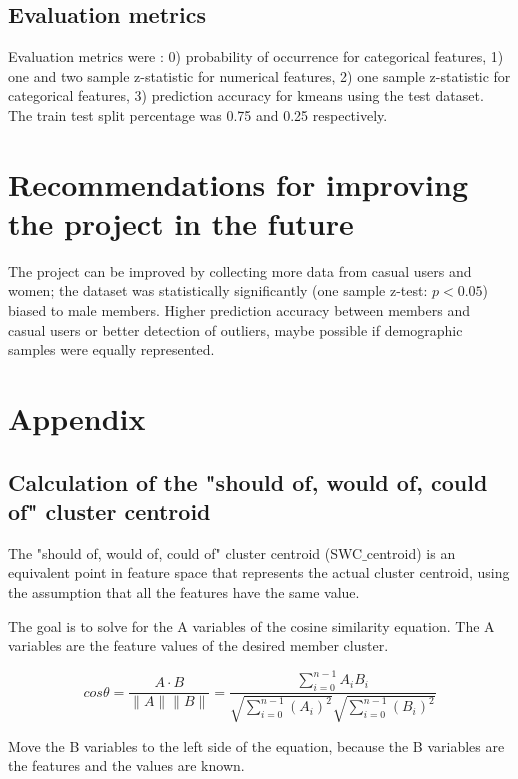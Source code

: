 \documentclass[11pt, onecolumn]{article}
\begin{document}
\subsection{Evaluation metrics}

Evaluation metrics were : 0) probability of occurrence for categorical features, 1) one and two sample z-statistic for numerical features, 2) one sample z-statistic for categorical features, 3) prediction accuracy for kmeans using the test dataset. The train test split percentage was 0.75 and 0.25 respectively.


\section{Recommendations for improving the project in the future}

The project can be improved by collecting more data from casual users and women; the dataset was statistically significantly (one sample z-test: $p < 0.05$) biased to male members. Higher prediction accuracy between members and casual users or better detection of outliers, maybe possible if demographic samples were equally represented.  



\section{Appendix}

\subsection{Calculation of the "should of, would of, could of" cluster centroid}

The "should of, would of, could of" cluster centroid (SWC$\_$centroid) is an equivalent point in feature space that represents the actual cluster centroid, using the assumption that all the features have the same value.

The goal is to solve for the A variables of the cosine similarity equation. The A variables are the feature values of the desired member cluster.

\begin{equation}
cos \theta = \frac{A \cdot B }{\|A\| \|B\|} = \frac{\sum^{n-1}_{i=0} A_i B_i}{\sqrt{\sum^{n-1}_{i=0} (A_i)^{2}} \sqrt{\sum^{n-1}_{i=0} (B_i)^{2}} }
\end{equation}

Move the B variables to the left side of the equation, because the B variables are the features and the values are known.
\end{document}
